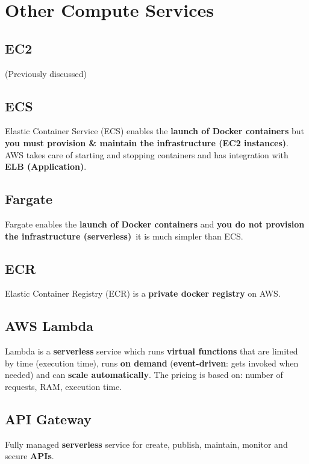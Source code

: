 \section{Other Compute Services}\label{sec:other-compute-services}

\subsection{EC2}\label{subsec:ec2}
(Previously discussed)

\subsection{ECS}\label{subsec:ecs}
Elastic Container Service (ECS) enables the \textbf{launch of Docker containers} but \textbf{you must provision \& maintain the infrastructure (EC2 instances)}\@.
AWS takes care of starting and stopping containers and has integration with \textbf{ELB (Application)}\@.

\subsection{Fargate}\label{subsec:fargate}
Fargate enables the \textbf{launch of Docker containers} and \textbf{you do not provision the infrastructure (serverless)}\, it is much simpler than ECS\@.

\subsection{ECR}\label{subsec:ecr}
Elastic Container Registry (ECR) is a \textbf{private docker registry} on AWS\@.

\subsection{AWS Lambda}\label{subsec:aws-lambda}
Lambda is a \textbf{serverless} service which runs \textbf{virtual functions} that are limited by time (execution time), runs \textbf{on demand} (\textbf{event-driven}: gets invoked when needed) and can \textbf{scale automatically}\@.
The pricing is based on: number of requests, RAM, execution time.

\subsection{API Gateway}\label{subsec:api-gateway}
Fully managed \textbf{serverless} service for create, publish, maintain, monitor and secure \textbf{APIs}\@.

